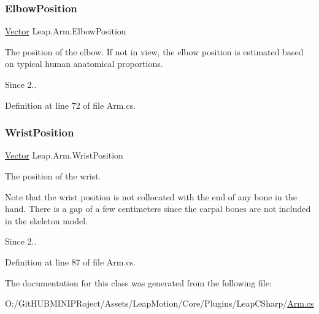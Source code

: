 \subsubsection{\texorpdfstring{ElbowPosition}{ElbowPosition}}
{\footnotesize\ttfamily \mbox{\hyperlink{struct_leap_1_1_vector}{Vector}} Leap.\+Arm.\+Elbow\+Position\hspace{0.3cm}{\ttfamily [get]}}



The position of the elbow. If not in view, the elbow position is estimated based on typical human anatomical proportions. 

\begin{DoxySince}{Since}
2.. 
\end{DoxySince}


Definition at line 72 of file Arm.\+cs.

\mbox{\label{class_leap_1_1_arm_a2ab323132d053651016290600610483b}} 
\subsubsection{\texorpdfstring{WristPosition}{WristPosition}}
{\footnotesize\ttfamily \mbox{\hyperlink{struct_leap_1_1_vector}{Vector}} Leap.\+Arm.\+Wrist\+Position\hspace{0.3cm}{\ttfamily [get]}}



The position of the wrist. 

Note that the wrist position is not collocated with the end of any bone in the hand. There is a gap of a few centimeters since the carpal bones are not included in the skeleton model.

\begin{DoxySince}{Since}
2.. 
\end{DoxySince}


Definition at line 87 of file Arm.\+cs.



The documentation for this class was generated from the following file\+:\begin{DoxyCompactItemize}
\item 
O\+:/\+Git\+H\+U\+B\+M\+I\+N\+I\+P\+Roject/\+Assets/\+Leap\+Motion/\+Core/\+Plugins/\+Leap\+C\+Sharp/\mbox{\hyperlink{_arm_8cs}{Arm.\+cs}}\end{DoxyCompactItemize}
